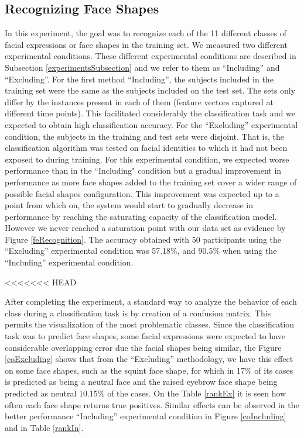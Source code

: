\documentclass[]{article}
\begin{document}
\subsection{Recognizing Face Shapes}
In this experiment, the goal was to recognize each of the 11 different classes of facial expressions or face shapes in
the training set. We measured two different experimental conditions. These different experimental conditions are
described in Subsection \ref{experimentsSubsection} and we refer to them as ``Including'' and ``Excluding''. For the
first method ``Including'', the subjects included in the training set were the same as the subjects included on the test
set. The sets only differ by the instances present in each of them (feature vectors captured at different time points).
This facilitated considerably the classification task and we expected to obtain high classification accuracy. For the
``Excluding'' experimental condition, the subjects in the training and test sets were disjoint. That is, the
classification algorithm was tested on facial identities to which it had not been exposed to during training. For this
experimental condition, we expected worse performance than in the ``Including" condition but a gradual improvement in
performance as more face shapes added to the training set cover a wider range of possible facial shapes configuration.
This improvement was expected up to a point from which on, the system would start to gradually decrease in performance
by reaching the saturating capacity of the classification model. However we never reached a saturation point with our
data set as evidence by Figure \ref{feRecognition}. The accuracy obtained with 50 participants using the ``Excluding''
experimental condition was 57.18\%, and 90.5\% when using the ``Including'' experimental condition.
 
<<<<<<< HEAD
 
After completing the experiment, a standard way to analyze the behavior of each class during a classification task is by
creation of a confusion matrix. This permits the visualization of the most problematic classes. Since the classification
task was to predict face shapes, some facial expressions were expected to have considerable overlapping error due the
facial shapes being similar, the Figure \ref{coExcluding} shows that from the ``Excluding'' methodology, we have this
effect on some face shapes, such as the squint face shape, for which in 17\% of its cases is predicted as being a
neutral face and the raised eyebrow face shape being predicted as neutral 10.15\% of the cases.
On the Table \ref{rankEx} it is seen how often each face shape returns
true positives. Similar effects can be observed in the better performance ``Including'' experimental condition in Figure
\ref{coIncluding} and in Table \ref{rankIn}. 
\end{document}

